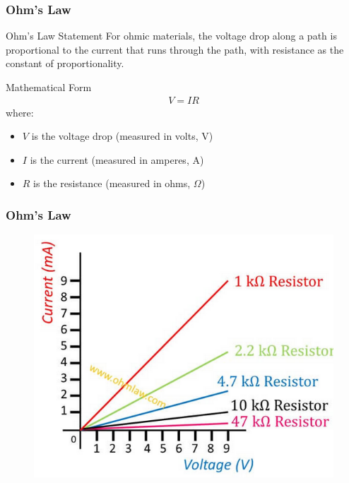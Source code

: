 \documentclass{beamer}
\begin{document}
\begin{frame}
\frametitle{Ohm's Law}
\begin{block}{Ohm's Law Statement}
For ohmic materials, the voltage drop along a path is proportional to the current that runs through the path, with resistance as the constant of proportionality.
\end{block}

\begin{block}{Mathematical Form}
\begin{align}
V = IR
\end{align}
where:
\begin{itemize}
\item $V$ is the voltage drop (measured in volts, V)
\item $I$ is the current (measured in amperes, A)
\item $R$ is the resistance (measured in ohms, $\Omega$)
\end{itemize}
\end{block}
\end{frame}

\begin{frame}
\frametitle{Ohm's Law}
\begin{alertblock}{}
\begin{figure}
    \centering
    \includegraphics[width=0.7\linewidth]{ohmgr.png}
\end{figure}
\end{alertblock}
\end{frame}
\end{document}
